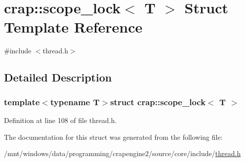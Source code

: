 \hypertarget{structcrap_1_1scope__lock}{}\section{crap\+:\+:scope\+\_\+lock$<$ T $>$ Struct Template Reference}
\label{structcrap_1_1scope__lock}


{\ttfamily \#include $<$thread.\+h$>$}



\subsection{Detailed Description}
\subsubsection*{template$<$typename T$>$struct crap\+::scope\+\_\+lock$<$ T $>$}



Definition at line 108 of file thread.\+h.



The documentation for this struct was generated from the following file\+:\begin{DoxyCompactItemize}
\item 
/mnt/windows/data/programming/crapengine2/source/core/include/\hyperlink{thread_8h}{thread.\+h}\end{DoxyCompactItemize}
